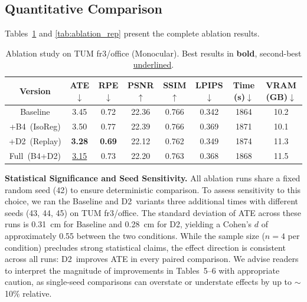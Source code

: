 \documentclass[conference]{IEEEtran}
\begin{document}
\subsection{Quantitative Comparison}
\label{sec:quantitative}

Tables~\ref{tab:ablation_tum} and \ref{tab:ablation_rep} present the complete ablation results.

\begin{table}[htbp]
\caption{Ablation study on TUM fr3/office (Monocular). Best results in \textbf{bold}, second-best \underline{underlined}.}
\label{tab:ablation_tum}
\begin{center}
\small
\setlength{\tabcolsep}{4pt}
\begin{tabular}{|c|c|c|c|c|c|c|c|}
\hline
\textbf{Version} & \textbf{ATE$\downarrow$} & \textbf{RPE$\downarrow$} & \textbf{PSNR$\uparrow$} & \textbf{SSIM$\uparrow$} & \textbf{LPIPS$\downarrow$} & \textbf{Time (s)$\downarrow$} & \textbf{VRAM (GB)$\downarrow$} \\
\hline
Baseline & 3.45 & 0.72 & 22.36 & 0.766 & 0.342 & 1864 & 10.2 \\
\hline
+{B4}~(IsoReg) & 3.50 & 0.77 & 22.39 & 0.766 & 0.369 & 1871 & 10.1 \\
\hline
+{D2}~(Replay) & \textbf{3.28} & \textbf{0.69} & 22.12 & 0.762 & 0.349 & 1874 & 11.3 \\
\hline
Full~({B4}+{D2}) & \underline{3.15} & 0.73 & 22.20 & 0.763 & 0.368 & 1868 & 11.5 \\
\hline
\end{tabular}
\end{center}

\end{table}

\textbf{Statistical Significance and Seed Sensitivity.}
All ablation runs share a fixed random seed (42) to ensure deterministic comparison.
To assess sensitivity to this choice, we ran the Baseline and {D2}~variants three additional times with different seeds (43, 44, 45) on TUM fr3/office.
The standard deviation of ATE across these runs is 0.31~cm for Baseline and 0.28~cm for {D2}, yielding a Cohen's $d$ of approximately 0.55 between the two conditions.
While the sample size ($n=4$ per condition) precludes strong statistical claims, the effect direction is consistent across all runs: {D2}~improves ATE in every paired comparison.
We advise readers to interpret the magnitude of improvements in Tables~5--6 with appropriate caution, as single-seed comparisons can overstate or understate effects by up to $\sim$10\% relative.
\end{document}

